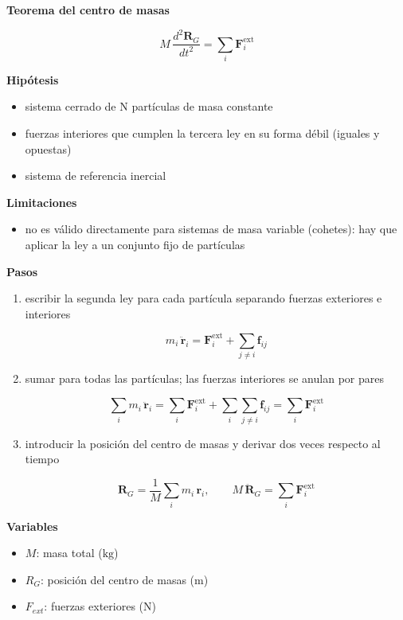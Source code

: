 \documentclass[10pt,openany]{book}
\begin{document}
\begin{tcolorbox}[title={Desarrollos del modelo}, studiumdef, breakable]

\noindent\textbf{Teorema del centro de masas}

\[
M\,\frac{d^{2}\mathbf{R}_G}{dt^{2}} = \sum_i \mathbf{F}_i^{\mathrm{ext}}
\]

\noindent\textbf{Hipótesis}
\begin{itemize}
\item sistema cerrado de N partículas de masa constante
\item fuerzas interiores que cumplen la tercera ley en su forma débil (iguales y opuestas)
\item sistema de referencia inercial
\end{itemize}

\noindent\textbf{Limitaciones}
\begin{itemize}
\item no es válido directamente para sistemas de masa variable (cohetes): hay que aplicar la ley a un conjunto fijo de partículas
\end{itemize}

\noindent\textbf{Pasos}
\begin{enumerate}
\item
escribir la segunda ley para cada partícula separando fuerzas exteriores e interiores

\[
m_i\,\ddot{\mathbf{r}}_i = \mathbf{F}_i^{\mathrm{ext}} + \sum_{j\neq i}\mathbf{f}_{ij}
\]
\item
sumar para todas las partículas; las fuerzas interiores se anulan por pares

\[
\sum_i m_i\,\ddot{\mathbf{r}}_i = \sum_i \mathbf{F}_i^{\mathrm{ext}} + \sum_i\sum_{j\neq i}\mathbf{f}_{ij} = \sum_i \mathbf{F}_i^{\mathrm{ext}}
\]
\item
introducir la posición del centro de masas y derivar dos veces respecto al tiempo

\[
\mathbf{R}_G = \frac{1}{M}\sum_i m_i\,\mathbf{r}_i,\qquad M\,\ddot{\mathbf{R}}_G = \sum_i \mathbf{F}_i^{\mathrm{ext}}
\]
\end{enumerate}

\noindent\textbf{Variables}
\begin{itemize}
\item $M$: masa total ($\mathrm{kg}$)
\item $R_{G}$: posición del centro de masas ($\mathrm{m}$)
\item $F_{ext}$: fuerzas exteriores ($\mathrm{N}$)
\end{itemize}




\end{tcolorbox}
\end{document}
